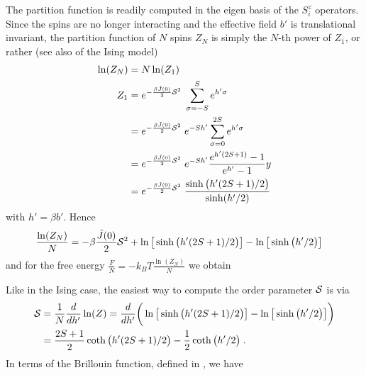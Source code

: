 The partition function is readily computed in the eigen basis of the $S_{i}^{z}$ operators.
%
Since the spins are no longer interacting and the effective field $b'$ is translational invariant,
 the partition function  of $N$ spins $Z_{N}$ is simply the $N$-th power of $Z_{1}$,
 or rather (see also  of the Ising model)
\begin{align*}
\ln(Z_{N}) &= N \ln(Z_{1})\\
Z_{1}&=e^{-\frac{\beta  \tilde J(0)}{2} {\cal S}^{2}}\; \sum_{\sigma=-S}^{S} 
e^{h' \sigma}\\
&=e^{-\frac{\beta  \tilde J(0)}{2} {\cal S}^{2}}\; e^{-S h'}\sum_{\sigma=0}^{2S} 
e^{h' \sigma}\\
&=e^{-\frac{\beta  \tilde J(0)}{2} {\cal S}^{2}}\; e^{-S h'}\frac{e^{h'(2S+1)}-1}{e^{h'}-1}y\\
&=e^{-\frac{\beta  \tilde J(0)}{2} {\cal S}^{2}}\; 
\frac{\sinh\big( h'(2S +1)/2 \big)}{\sinh(h'/2)}
\end{align*}
%
with $h' =\beta b'$.
Hence
%
\begin{align*}
\frac{\ln(Z_{N})}{N} &= -\beta \frac{ \tilde J(0)}{2} {\cal S}^{2}+  \ln\big[ \sinh\big( h'(2S +1) /2\big)\big]
-  \ln\big[ \sinh\big( h'/2 \big)\big]
\end{align*}
%
and for the free energy 
%
$\frac{F}{N} = -k_{B}T\frac{\ln(Z_{N})}{N}$
%
we obtain
%

%
Like in the Ising case, the easiest way to compute the  order parameter ${\cal S}$ is via
%
\begin{align*}
{\cal S} &= \frac{1}{N}\frac{d}{d h'} \ln(Z)= \frac{d}{dh'}\bigg( \ln\big[ \sinh\big( h'(2S +1) /2\big)\big]
-  \ln\big[ \sinh\big( h'/2 \big)\big]\bigg)\\
&= \frac{2S+1}{2} \coth\big( h'(2S +1) /2\big)
- \frac{1}{2}  \coth\big( h'/2 \big)\;.
\end{align*}
%
In terms of the Brillouin function, defined in , we have

%

